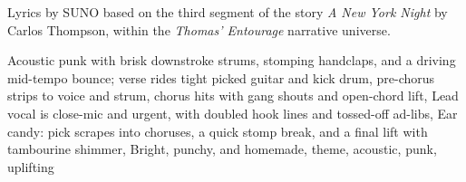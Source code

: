 
\begin{notes}
Lyrics by SUNO based on the third segment of the story \emph{A New York Night} by Carlos Thompson, %
within the \emph{Thomas’ Entourage} narrative universe.
\end{notes}
\begin{style}
Acoustic punk with brisk downstroke strums, stomping handclaps, and a driving mid-tempo bounce; verse rides tight picked guitar and kick drum, pre-chorus strips to voice and strum, chorus hits with gang shouts and open-chord lift, Lead vocal is close-mic and urgent, with doubled hook lines and tossed-off ad-libs, Ear candy: pick scrapes into choruses, a quick stomp break, and a final lift with tambourine shimmer, Bright, punchy, and homemade, theme, acoustic, punk, uplifting
\end{style}
